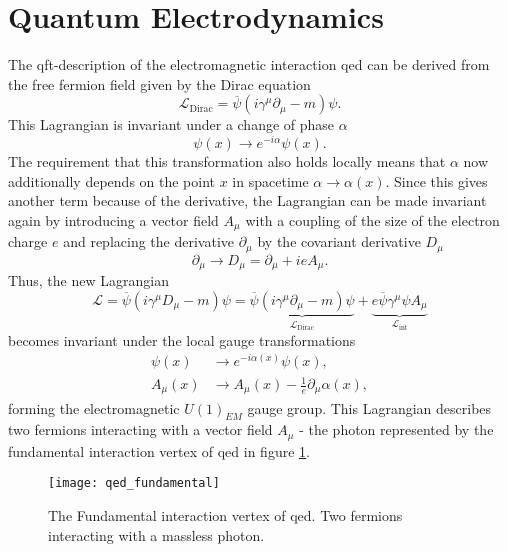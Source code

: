\section{Quantum Electrodynamics}\label{sec:qed}
The \ac{qft}-description of the electromagnetic interaction \ac{qed} can be derived from the free fermion field given by the Dirac equation
\begin{equation}
    \mathcal{L}_\mathrm{Dirac} = \overline{\psi}(i \gamma^\mu \partial_\mu - m )\psi.
    \label{eq:dirac}
\end{equation}
This Lagrangian is invariant under a change of phase $\alpha$
\begin{equation}
    \psi(x) \rightarrow  e^{-i \alpha}\psi(x).
\end{equation}
The requirement that this transformation also holds locally means that $\alpha$ now additionally depends on the point $x$ in spacetime $\alpha \rightarrow \alpha(x)$. Since this gives another term because of the derivative, the Lagrangian can be made invariant again by introducing a vector field $A_\mu$ with a coupling of the size of the electron charge $e$ and replacing the derivative $\partial_\mu$ by the covariant derivative $D_\mu$
\begin{equation}
    \partial_\mu \rightarrow D_\mu = \partial_\mu + ie A_\mu.
    \label{eq:cov_diff}
\end{equation}
Thus, the new Lagrangian
\begin{equation}
    \mathcal{L} = \overline{\psi}(i \gamma^\mu D_\mu - m )\psi
    =
    \underbrace{\overline{\psi}(i \gamma^\mu \partial_\mu - m )\psi}_{\mathcal{L}_\mathrm{Dirac} }
    +
    \underbrace{ e\overline{\psi} \gamma^\mu {\psi}A_\mu}_{\mathcal{L}_\mathrm{int}}
\end{equation}
becomes invariant under the local gauge transformations
\begin{align}
    \psi(x)  & \rightarrow  e^{-i \alpha(x)}\psi(x),                      \\
    A_\mu(x) & \xrightarrow{} A_\mu(x) -\frac{1}{e}\partial_\mu\alpha(x),
\end{align}
forming the electromagnetic $U(1)_{EM}$ gauge group.
This Lagrangian describes two fermions interacting with a vector field $A_\mu$ - the photon represented by the fundamental interaction vertex of \ac{qed} in figure \ref{fig:qed_fundamental}.
\begin{figure}
    \centering
    \texttt{[image: qed\_fundamental]}
    \caption[]{The Fundamental interaction vertex of \ac{qed}. Two fermions interacting with a massless photon.}
    \label{fig:qed_fundamental}
\end{figure}
